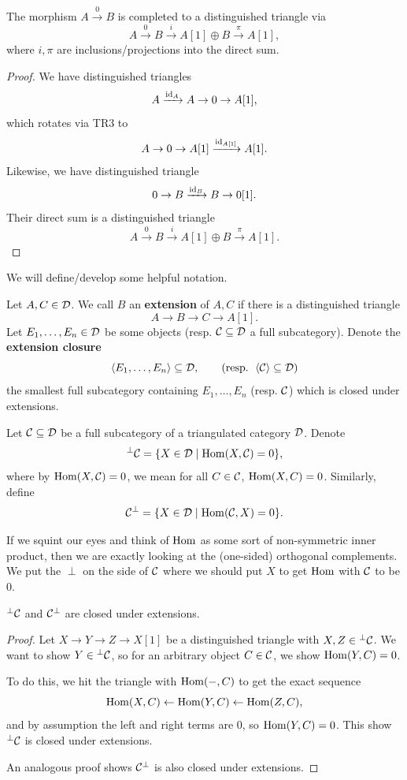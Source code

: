 \documentclass[12pt]{article}
\begin{document}
\begin{prop}\label{zero-morphism-triangle}
    The morphism $A\xrightarrow{0} B$ is completed to a distinguished triangle via
    \[A \xrightarrow{0} B \xrightarrow{i} A[1] \oplus B \xrightarrow{\pi} A[1],\]
    where $i,\pi$ are inclusions/projections into the direct sum.
\end{prop}

\begin{proof}
    We have distinguished triangles
    \[A\xrightarrow{\mathrm{id}_A} A \to 0 \to A[1],\]
    which rotates via TR3 to
    \[A \to 0 \to A[1] \xrightarrow{\mathrm{id}_{A[1]}} A[1].\]
    Likewise, we have distinguished triangle
    \[0 \to B \xrightarrow{\mathrm{id}_B} B \to 0[1].\]
    Their direct sum is a distinguished triangle
    \[A\xrightarrow{0} B \xrightarrow{i} A[1]\oplus B \xrightarrow{\pi} A[1].\]
\end{proof}

We will define/develop some helpful notation.
\begin{defn}
    Let $A,C\in \mathcal{D}$. We call $B$ an \textbf{extension} of $A,C$ if there is a distinguished triangle
    \[A\to B\to C \to A[1].\]
    Let $E_1,\dots,E_n \in \mathcal{D}$ be some objects (resp. $\mathcal{C}\subseteq \mathcal{D}$ a full subcategory). Denote the \textbf{extension closure}
    \[\left\langle E_1,\dots,E_n\right\rangle \subseteq \mathcal{D}, \qquad (\text{resp. } \left\langle\mathcal{C}\right\rangle\subseteq \mathcal{D})\]
    the smallest full subcategory containing $E_1,\dots,E_n$ (resp. $\mathcal{C}$) which is closed under extensions.
\end{defn}

\begin{defn}
    Let $\mathcal{C} \subseteq \mathcal{D}$ be a full subcategory of a triangulated category $\mathcal{D}$. Denote
    \[{}^\perp\mathcal{C} = \{X\in \mathcal{D} \mid \mathrm{Hom}(X,\mathcal{C})=0\},\]
    where by $\mathrm{Hom}(X,\mathcal{C})=0$, we mean for all $C\in \mathcal{C}$, $\mathrm{Hom}(X,C)=0$. Similarly, define
    \[\mathcal{C}^\perp = \{X\in \mathcal{D} \mid \mathrm{Hom}(\mathcal{C},X)=0\}.\]
\end{defn}

If we squint our eyes and think of $\mathrm{Hom}$ as some sort of non-symmetric inner product, then we are exactly looking at the (one-sided) orthogonal complements. We put the $\perp$ on the side of $\mathcal{C}$ where we should put $X$ to get $\mathrm{Hom}$ with $\mathcal{C}$ to be 0.

\begin{prop}
    ${}^\perp\mathcal{C}$ and $\mathcal{C}^\perp$ are closed under extensions.
\end{prop}

\begin{proof}
    Let $X\to Y\to Z\to X[1]$ be a distinguished triangle with $X,Z\in {}^\perp \mathcal{C}$. We want to show $Y\in {}^\perp \mathcal{C}$, so for an arbitrary object $C\in \mathcal{C}$, we show $\mathrm{Hom}(Y,C)=0$.

    To do this, we hit the triangle with $\mathrm{Hom}(-,C)$ to get the exact sequence
    \[\mathrm{Hom}(X,C) \leftarrow \mathrm{Hom}(Y,C) \leftarrow \mathrm{Hom}(Z,C),\]
    and by assumption the left and right terms are 0, so $\mathrm{Hom}(Y,C)=0$. This show ${}^\perp\mathcal{C}$ is closed under extensions.

    An analogous proof shows $\mathcal{C}^\perp$ is also closed under extensions.
\end{proof}
\end{document}
